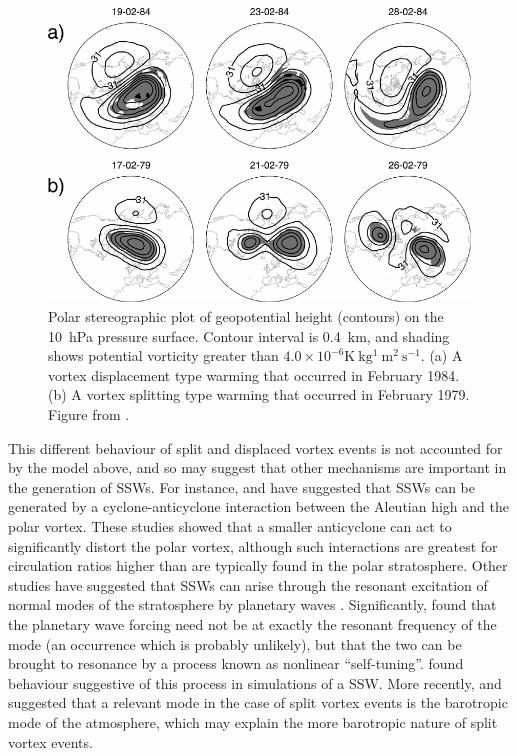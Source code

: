 \begin{figure}
 \centering
 \noindent\includegraphics[width=\textwidth]{figures/chapter-intro/charlton_polvani_SSW.pdf}
 \caption[Examples of a split and displaced vortex event from
 \citet{Charlton2007a}]{Polar stereographic plot of geopotential height
   (contours) on the 10~hPa pressure surface. Contour interval is 0.4~km, and
   shading shows potential vorticity greater than
   $4.0 \times 10^{-6} \mathrm{K~kg^1~m^2~s^{-1}}$. (a) A vortex displacement
   type warming that occurred in February 1984. (b) A vortex splitting type
   warming that occurred in February 1979. Figure from \citet{Charlton2007}.}
 \label{fig:charlton_polvani_ssw}
\end{figure}

This different behaviour of split and displaced vortex events is not accounted
for by the \citet{Matsuno1970, Matsuno1971} model above, and so may suggest that
other mechanisms are important in the generation of SSWs. For instance,
\citet{ONeill1988} and \citet{Scott2006} have suggested that SSWs can be
generated by a cyclone-anticyclone interaction between the Aleutian high and the
polar vortex. These studies showed that a smaller anticyclone can act to
significantly distort the polar vortex, although such interactions are greatest
for circulation ratios higher than are typically found in the polar
stratosphere. Other studies have suggested that SSWs can arise through the
resonant excitation of normal modes of the stratosphere by planetary waves
\citep{Tung1979}. Significantly, \citet{Plumb1981} found that the planetary wave
forcing need not be at exactly the resonant frequency of the mode (an occurrence
which is probably unlikely), but that the two can be brought to resonance by a
process known as nonlinear ``self-tuning''. \citet{Smith1989} found behaviour
suggestive of this process in simulations of a SSW. More recently,
\citet{Esler2005} and \citet{Esler2006} suggested that a relevant mode in the
case of split vortex events is the barotropic mode of the atmosphere, which may
explain the more barotropic nature of split vortex events.

